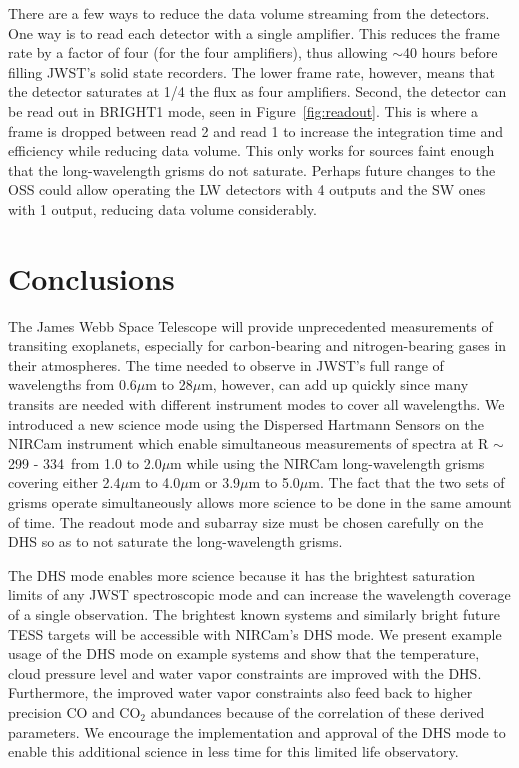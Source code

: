 \documentclass[iop]{emulateapj}
\newcommand{\DHSres}{299 - 334}
\begin{document}
There are a few ways to reduce the data volume streaming from the detectors.
One way is to read each detector with a single amplifier.
This reduces the frame rate by a factor of four (for the four amplifiers), thus allowing $\sim$40 hours before filling JWST's solid state recorders.
The lower frame rate, however, means that the detector saturates at 1/4 the flux as four amplifiers.
Second, the detector can be read out in BRIGHT1 mode, seen in Figure~\ref{fig:readout}.
This is where a frame is dropped between read 2 and read 1 to increase the integration time and efficiency while reducing data volume.
This only works for sources faint enough that the long-wavelength grisms do not saturate.
Perhaps future changes to the OSS could allow operating the LW detectors with 4 outputs and the SW ones with 1 output, reducing data volume considerably.

\section{Conclusions}

The James Webb Space Telescope will provide unprecedented measurements of transiting exoplanets, especially for carbon-bearing and nitrogen-bearing gases in their atmospheres.
The time needed to observe in JWST's full range of wavelengths from 0.6$\mu$m to 28$\mu$m, however, can add up quickly since many transits are needed with different instrument modes to cover all wavelengths.
We introduced a new science mode using the Dispersed Hartmann Sensors on the NIRCam instrument which enable simultaneous measurements of spectra at R $\sim$ \DHSres\ from 1.0 to 2.0$\mu$m while using the NIRCam long-wavelength grisms covering either 2.4$\mu$m to 4.0$\mu$m or 3.9$\mu$m to 5.0$\mu$m.
The fact that the two sets of grisms operate simultaneously allows more science to be done in the same amount of time.
The readout mode and subarray size must be chosen carefully on the DHS so as to not saturate the long-wavelength grisms.

The DHS mode enables more science because it has the brightest saturation limits of any JWST spectroscopic mode and can increase the wavelength coverage of a single observation.
The brightest known systems and similarly bright future TESS targets will be accessible with NIRCam's DHS mode.
We present example usage of the DHS mode on example systems and show that the temperature, cloud pressure level and water vapor constraints are improved with the DHS.
Furthermore, the improved water vapor constraints also feed back to higher precision CO and CO$_2$ abundances because of the correlation of these derived parameters.
We encourage the implementation and approval of the DHS mode to enable this additional science in less time for this limited life observatory.
\end{document}
